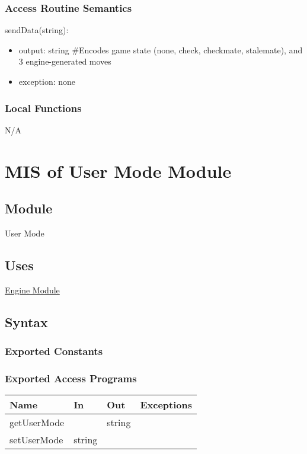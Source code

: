 \documentclass[12pt, titlepage]{article}
\begin{document}
    \subsubsection{Access Routine Semantics}
        \noindent sendData(string):
        \begin{itemize}
            \item output: string \#Encodes game state (none, check, 
                checkmate, stalemate), and 3 engine-generated moves
            \item exception: none
        \end{itemize}

    \subsubsection{Local Functions}
    N/A

    \newpage

\section{MIS of User Mode Module} \label{mMode}

    \subsection{Module}
    User Mode

    \subsection{Uses}
    \hyperref[mEngine]{Engine Module}

    \subsection{Syntax}
    \subsubsection{Exported Constants}

    \subsubsection{Exported Access Programs}
        \begin{center}
        \begin{tabular}{p{4.5cm} p{4cm} p{3cm} p{2.5cm}}
        \hline
        \textbf{Name} & \textbf{In} & \textbf{Out} & \textbf{Exceptions} \\
        \hline
        getUserMode & & string & \\
        \hline
        setUserMode & string & & \\
        \hline
        \end{tabular}
        \end{center}
\end{document}
